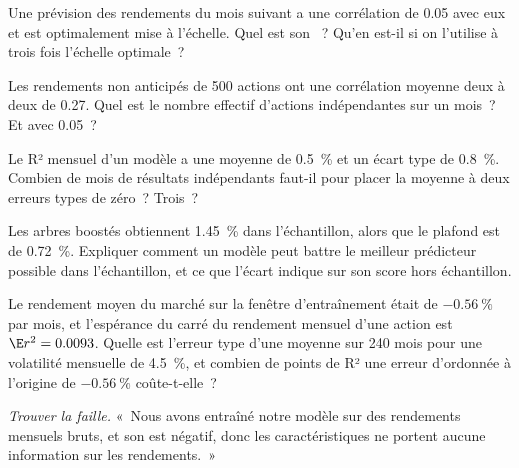 \begin{exercise}[$\star$]\label{exo:ml:why-financial-machine-learning-is-different:1}
Une prévision des rendements du mois suivant a une corrélation de 0.05 avec eux et est optimalement mise à l'échelle. Quel est son
~? Qu'en est-il si on l'utilise à trois fois l'échelle optimale~?
\end{exercise}

\begin{exercise}[$\star$]\label{exo:ml:why-financial-machine-learning-is-different:2}
Les rendements non anticipés de 500 actions ont une corrélation moyenne deux à deux de 0.27. Quel est le nombre effectif
d'actions indépendantes sur un mois~? Et avec 0.05~?
\end{exercise}

\begin{exercise}[$\star$]\label{exo:ml:why-financial-machine-learning-is-different:3}
Le R² mensuel d'un modèle a une moyenne de 0.5~\% et un écart type de 0.8~\%. Combien de mois de résultats indépendants
faut-il pour placer la moyenne à deux erreurs types de zéro~? Trois~?
\end{exercise}

\begin{exercise}[$\star\star$]\label{exo:ml:why-financial-machine-learning-is-different:4}
Les arbres boostés obtiennent 1.45~\% dans l'échantillon, alors que le plafond est de 0.72~\%. Expliquer comment un modèle peut battre le meilleur prédicteur possible
dans l'échantillon, et ce que l'écart indique sur son score hors échantillon.
\end{exercise}

\begin{exercise}[$\star\star$]\label{exo:ml:why-financial-machine-learning-is-different:5}
Le rendement moyen du marché sur la fenêtre d'entraînement était de $-0.56~\%$ par mois, et l'espérance du carré du rendement mensuel d'une action est
$\E r^2 = 0.0093$. Quelle est l'erreur type d'une moyenne sur 240 mois pour une volatilité mensuelle
de 4.5~\%, et combien de points de R² une erreur d'ordonnée à l'origine de $-0.56~\%$ coûte-t-elle~?
\end{exercise}

\begin{exercise}[$\star\star$]\label{exo:ml:why-financial-machine-learning-is-different:6}
\emph{Trouver la faille.} «~Nous avons entraîné notre modèle sur des rendements mensuels bruts, et son  est négatif, donc les caractéristiques
ne portent aucune information sur les rendements.~»
\end{exercise}

